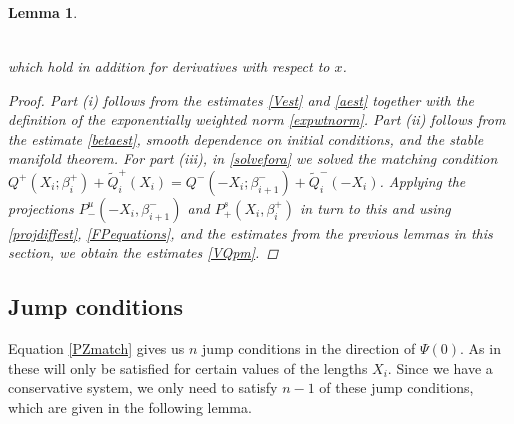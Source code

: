\documentclass[12pt]{elsarticle}
\theoremstyle{plain}
\newtheorem{lemma}[theorem]{Lemma}
\theoremstyle{definition}
\theoremstyle{remark}
\numberwithin{theorem}{section}
\numberwithin{equation}{section}
\begin{document}
\begin{lemma}
\begin{enumerate}[(i)]
\begin{equation}
\begin{aligned}
\end{aligned}
\end{equation}
\end{enumerate}
which hold in addition for derivatives with respect to $x$.
\begin{proof}
Part (i) follows from the estimates \cref{Vest} and \cref{aest} together with the definition of the exponentially weighted norm \cref{expwtnorm}. Part (ii) follows from the estimate \cref{betaest}, smooth dependence on initial conditions, and the stable manifold theorem. For part (iii), in \cref{solvefora} we solved the matching condition $Q^+(X_i; \beta_i^+) + \tilde{Q}_i^+(X_i) = Q^-(-X_i; \beta_{i+1}^-) + \tilde{Q}_i^-(-X_i)$. Applying the projections $P^u_-(-X_i, \beta_{i+1}^-)$ and $P^s_+(X_i, \beta_i^+)$ in turn to this and using \cref{projdiffest}, \cref{FPequations}, and the estimates from the previous lemmas in this section, we obtain the estimates \cref{VQpm}.
\end{proof}
\end{lemma}

\subsection{Jump conditions}

Equation \cref{PZmatch} gives us $n$ jump conditions in the direction of $\Psi(0)$. As in \cite{SandstedeStrut,Sandstede1998} these will only be satisfied for certain values of the lengths $X_i$. Since we have a conservative system, we only need to satisfy $n-1$ of these jump conditions, which are given in the following lemma.
\end{document}
